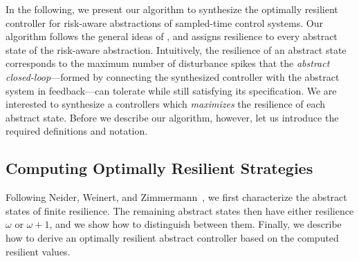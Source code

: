 %


In the following, we present our algorithm to synthesize the optimally resilient controller for risk-aware abstractions of sampled-time control systems.
Our algorithm follows the general ideas of \cite{DBLP:conf/csl/NeiderW018}, and assigns resilience to every abstract state of the risk-aware abstraction.
Intuitively, the resilience of an abstract state corresponds to the maximum number of disturbance spikes that the \emph{abstract closed-loop}---formed by connecting the synthesized controller with the abstract system in feedback---can tolerate while still satisfying its specification.
We are interested to synthesize a controllers which \emph{maximizes} the resilience of each abstract state.
Before we describe our algorithm, however, let us introduce the required definitions and notation.



\subsection{Computing Optimally Resilient Strategies}
Following Neider, Weinert, and Zimmermann~\cite{DBLP:conf/csl/NeiderW018}, we first characterize the abstract states of finite resilience.
The remaining abstract states then have either resilience $\omega$ or $\omega +1$, and we show how to distinguish between them.
Finally, we describe how to derive an optimally resilient abstract controller based on the computed resilient values.

